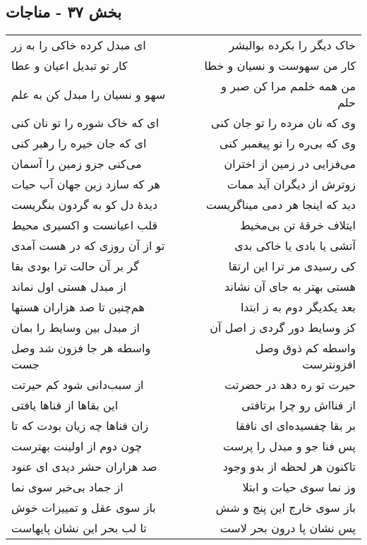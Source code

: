 \begin{center}
\section*{بخش ۳۷ - مناجات}
\label{sec:sh037}
\begin{longtable}{l p{0.5cm} r}
ای مبدل کرده خاکی را به زر
&&
خاک دیگر را بکرده بوالبشر
\\
کار تو تبدیل اعیان و عطا
&&
کار من سهوست و نسیان و خطا
\\
سهو و نسیان را مبدل کن به علم
&&
من همه خلمم مرا کن صبر و حلم
\\
ای که خاک شوره را تو نان کنی
&&
وی که نان مرده را تو جان کنی
\\
ای که جان خیره را رهبر کنی
&&
وی که بی‌ره را تو پیغمبر کنی
\\
می‌کنی جزو زمین را آسمان
&&
می‌فزایی در زمین از اختران
\\
هر که سازد زین جهان آب حیات
&&
زوترش از دیگران آید ممات
\\
دیدهٔ دل کو به گردون بنگریست
&&
دید که اینجا هر دمی میناگریست
\\
قلب اعیانست و اکسیری محیط
&&
ایتلاف خرقهٔ تن بی‌مخیط
\\
تو از آن روزی که در هست آمدی
&&
آتشی یا بادی یا خاکی بدی
\\
گر بر آن حالت ترا بودی بقا
&&
کی رسیدی مر ترا این ارتقا
\\
از مبدل هستی اول نماند
&&
هستی بهتر به جای آن نشاند
\\
هم‌چنین تا صد هزاران هستها
&&
بعد یکدیگر دوم به ز ابتدا
\\
از مبدل بین وسایط را بمان
&&
کز وسایط دور گردی ز اصل آن
\\
واسطه هر جا فزون شد وصل جست
&&
واسطه کم ذوق وصل افزونترست
\\
از سبب‌دانی شود کم حیرتت
&&
حیرت تو ره دهد در حضرتت
\\
این بقاها از فناها یافتی
&&
از فنااش رو چرا برتافتی
\\
زان فناها چه زیان بودت که تا
&&
بر بقا چفسیده‌ای ای نافقا
\\
چون دوم از اولینت بهترست
&&
پس فنا جو و مبدل را پرست
\\
صد هزاران حشر دیدی ای عنود
&&
تاکنون هر لحظه از بدو وجود
\\
از جماد بی‌خبر سوی نما
&&
وز نما سوی حیات و ابتلا
\\
باز سوی عقل و تمییزات خوش
&&
باز سوی خارج این پنج و شش
\\
تا لب بحر این نشان پایهاست
&&
پس نشان پا درون بحر لاست

\end{longtable}
\end{center}
